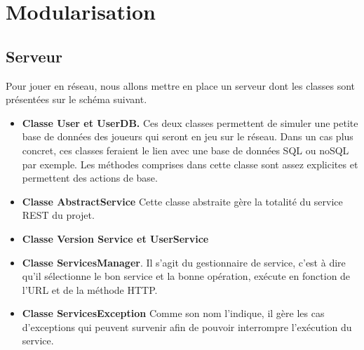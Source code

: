 \section{Modularisation}

\subsection{Serveur}

Pour jouer en réseau, nous allons mettre en place un serveur dont les classes sont présentées sur le schéma suivant. 

\begin{itemize}
    \item \textbf{Classe User et UserDB.}
    Ces deux classes permettent de simuler une petite base de données des joueurs qui seront en jeu sur le réseau. Dans un cas plus concret, ces classes feraient le lien avec une base de données SQL ou noSQL par exemple. Les méthodes comprises dans cette classe sont assez explicites et permettent des actions de base. 
    \newline 
    
    \item \textbf{Classe AbstractService}
    Cette classe abstraite gère la totalité du service REST du projet.
    
     \item \textbf{Classe Version Service et UserService}
     
     \item \textbf{Classe ServicesManager}. Il s'agit du gestionnaire de service, c'est à dire qu'il sélectionne le bon service et la bonne opération, exécute en fonction de l'URL et de la méthode HTTP. 
     
     \item \textbf{Classe ServicesException}
     Comme son nom l'indique, il gère les cas d'exceptions qui peuvent survenir afin de pouvoir interrompre l'exécution du service. 
     
     
\end{itemize} 
